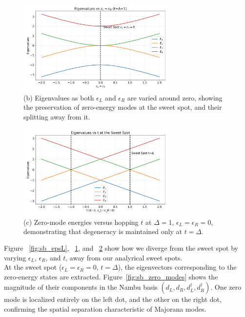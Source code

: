 \documentclass[11pt, letterpaper, titlepage]{article}
\begin{document}
\begin{figure}[htbp]
  \centering
  \includegraphics[width=0.7\textwidth]{../Figures/singlebody_sweetspot_epsLR.png}
  \caption{(b) Eigenvalues as both $\epsilon_L$ and $\epsilon_R$ are varied around zero, showing the preservation of zero-energy modes at the sweet spot, and their splitting away from it.}
  \label{fig:sb_epsLR}
\end{figure}

\begin{figure}[htbp]
  \centering
  \includegraphics[width=0.7\textwidth]{../Figures/singlebody_sweetspot_t.png}
  \caption{(c) Zero-mode energies versus hopping $t$ at $\Delta = 1$, $\epsilon_L = \epsilon_R = 0$, demonstrating that degeneracy is maintained only at $t = \Delta$.}
  \label{fig:sb_tscan}
\end{figure}
\newpage
Figure ~\ref{fig:sb_epsL}, ~\ref{fig:sb_epsLR}, and ~\ref{fig:sb_tscan} show how we diverge from the sweet spot by varying $\epsilon_L$, $\epsilon_R$, and $t$, away from our analyrical sweet spots.\\
At the sweet spot ($\epsilon_L = \epsilon_R = 0$, $t = \Delta$), the eigenvectors corresponding to the zero-energy states are extracted. Figure~\ref{fig:sb_zero_modes} shows the magnitude of their components in the Nambu basis $(d_L, d_R, d_L^\dagger, d_R^\dagger)$. One zero mode is localized entirely on the left dot, and the other on the right dot, confirming the spatial separation characteristic of Majorana modes.
\end{document}
